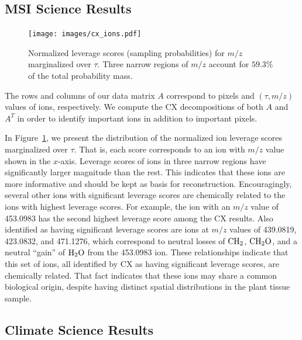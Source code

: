   

  \subsection{MSI Science Results}
  
  \begin{figure}[h!bt]
    \centering
    \texttt{[image: images/cx\_ions.pdf]}
      \caption{Normalized leverage scores (sampling probabilities) for $m/z$ marginalized over $\tau$.
        Three narrow regions of $m/z$ account for $59.3\%$ of the total probability mass.}
      \label{fig:cx_ions}
  \end{figure} 

  The rows and columns of our data matrix $A$ correspond to pixels and $(\tau, m/z)$ values of ions, respectively. 
  We compute the CX decompositions of both $A$ and $A^T$ in order to identify important ions in addition to important pixels.
   
  In Figure~\ref{fig:cx_ions}, we present the distribution of the normalized
  ion leverage scores marginalized over $\tau$. That is, each score corresponds
  to an ion with $m/z$ value shown in the $x$-axis. Leverage scores of ions in
  three narrow regions have significantly larger magnitude than the rest. This
  indicates that these ions are more informative and should be kept as basis
  for reconstruction.  Encouragingly, several other ions with significant
  leverage scores are chemically related to the ions with highest leverage
  scores.  For example, the ion with an $m/z$ value of 453.0983 has the second
  highest leverage score among the CX results.  Also identified as having
  significant leverage scores are ions at $m/z$ values of 439.0819, 423.0832,
  and 471.1276, which correspond to neutral losses of $\rm{CH_2}$,
  $\rm{CH_2O}$, and a neutral ``gain'' of $\rm{H_2O}$ from the 453.0983 ion.
  These relationships indicate that this set of ions, all identified by CX as
  having significant leverage scores, are chemically related.  That fact
  indicates that these ions may share a common biological origin, despite
  having distinct spatial distributions in the plant tissue sample.
  

  \subsection{Climate Science Results}

